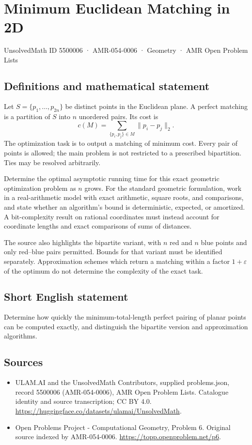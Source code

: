 \documentclass[11pt,a4paper]{article}
\begin{document}
\section*{Minimum Euclidean Matching in 2D}\label{5500006}
{\small UnsolvedMath ID 5500006 · AMR-054-0006 · Geometry · AMR Open Problem Lists}
\subsection{Definitions and mathematical statement}
Let $S=\{p_1,\ldots,p_{2n}\}$ be distinct points in the Euclidean plane.
A perfect matching is a partition of $S$ into $n$ unordered pairs. Its
cost is
\[
                  c(M)=\sum_{\{p_i,p_j\}\in M}\|p_i-p_j\|_2.
\]
The optimization task is to output a matching of minimum cost. Every
pair of points is allowed; the main problem is not restricted to a
prescribed bipartition. Ties may be resolved arbitrarily.

Determine the optimal asymptotic running time for this exact geometric
optimization problem as $n$ grows. For the standard geometric formulation,
work in a real-arithmetic model with exact arithmetic, square roots,
and comparisons, and state whether an algorithm's bound is deterministic,
expected, or amortized. A bit-complexity result on rational coordinates
must instead account for coordinate lengths and exact comparisons of
sums of distances.

The source also highlights the bipartite variant, with $n$ red and $n$
blue points and only red--blue pairs permitted. Bounds for that variant
must be identified separately. Approximation schemes which return a
matching within a factor $1+\varepsilon$ of the optimum do not determine
the complexity of the exact task.
\subsection{Short English statement}
Determine how quickly the minimum-total-length perfect pairing of
planar points can be computed exactly, and distinguish the bipartite
version and approximation algorithms.
\subsection{Sources}
\begin{itemize}
\item[S1] ULAM.AI and the UnsolvedMath Contributors, supplied problems.json, record 5500006 (AMR-054-0006), AMR Open Problem Lists. Catalogue identity and source transcription; CC BY 4.0.
\url{https://huggingface.co/datasets/ulamai/UnsolvedMath}.
\item[S2] Open Problems Project - Computational Geometry, Problem 6. Original source indexed by AMR-054-0006.
\url{https://topp.openproblem.net/p6}.
\end{itemize}
\end{document}
